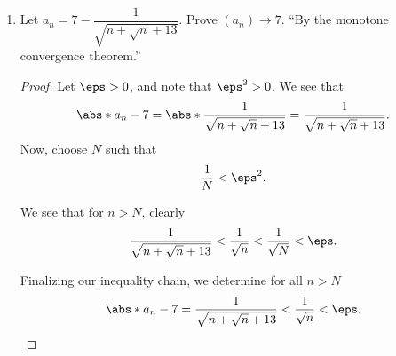 \begin{enumerate}
          \item Let $a_{n} = 7 - \dfrac{1}{\sqrt{n + \sqrt{n} + 13}}$. Prove $(a_{n}) \to 7$. ``By the monotone convergence theorem.''
                \begin{proof}
                  Let $\eps > 0$, and note that $\eps^{2} > 0$. We see that
                  \[
                    \abs*{a_{n} - 7} = \abs*{\frac{1}{\sqrt{n + \sqrt{n} + 13}}} = \frac{1}{\sqrt{n + \sqrt{n} + 13}}.
                  \]
                  Now, choose $N$ such that
                  \[
                    \frac{1}{N} < \eps^{2}.
                  \]

                  We see that for $n > N$, clearly
                  \[
                    \frac{1}{\sqrt{n + \sqrt{n} + 13}} < \frac{1}{\sqrt{n}} < \frac{1}{\sqrt{N}} < \eps.
                  \]

                  Finalizing our inequality chain, we determine for all $n > N$
                  \[
                    \abs*{a_{n} - 7} = \frac{1}{\sqrt{n + \sqrt{n} + 13}} < \frac{1}{\sqrt{n}} < \eps.
                  \]
                \end{proof}
        \end{enumerate}
